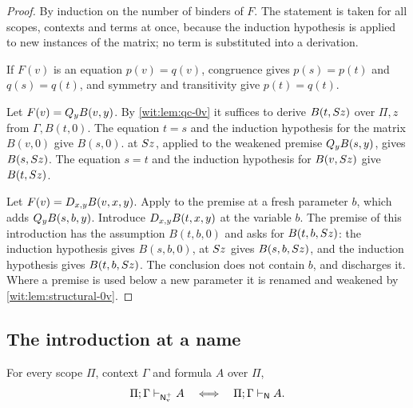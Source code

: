 \begin{proof}
By induction on the number of binders of $F$.  The statement is taken for
all scopes, contexts and terms at once, because the induction hypothesis is
applied to new instances of the matrix; no term is substituted into a
derivation.

If $F(v)$ is an equation $p(v)=q(v)$, congruence gives $p(s)=p(t)$ and
$q(s)=q(t)$, and symmetry and transitivity give $p(t)=q(t)$.

Let $F(v)=Q_{y}B(v,y)$.  By \cref{wit:lem:qc-0v} it suffices to derive
$B(t,S z)$ over $\Pi,z$ from $\Gamma,B(t,0)$.  The equation $t=s$ and the
induction hypothesis for the matrix $B(v,0)$ give $B(s,0)$.  
at $S z$, applied to the weakened premise $Q_{y}B(s,y)$, gives
$B(s,S z)$.  The equation $s=t$ and the induction hypothesis for
$B(v,S z)$ give $B(t,S z)$.

Let $F(v)=D_{x,y}B(v,x,y)$.  Apply  to the premise at a fresh
parameter $b$, which adds $Q_{y}B(s,b,y)$.  Introduce
$D_{x,y}B(t,x,y)$ at the variable $b$.  The premise of this introduction
has the assumption $B(t,b,0)$ and asks for $B(t,b,S z)$: the induction
hypothesis gives $B(s,b,0)$,  at $S z$ gives
$B(s,b,S z)$, and the induction hypothesis gives $B(t,b,S z)$.  The
conclusion does not contain $b$, and  discharges it.  Where a
premise is used below a new parameter it is renamed and weakened by
\cref{wit:lem:structural-0v}.
\end{proof}

\subsection{The introduction at a name}

\begin{theorem}
\label{wit:thm:named}
For every scope $\Pi$, context $\Gamma$ and formula $A$ over $\Pi$,
\[
 \Pi;\Gamma\vdash_{\mathsf{N}_{\mathrm v}^{+}}A
 \quad\Longleftrightarrow\quad
 \Pi;\Gamma\vdash_{\mathsf{N}}A .
\]
\end{theorem}

